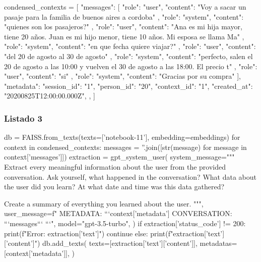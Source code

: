 \begin{APACode}
condensed_contexts = [
    {
        "messages": [
            {
                "role": "user",
                "content": "Voy a sacar un pasaje para la familia de buenos aires a cordoba"
            },
            {
                "role": "system",
                "content": "quienes son los pasajeros?"
            },
            {
                "role": "user",
                "content": "Ana es mi hija mayor, tiene 20 años. Juan es mi hijo menor, tiene 10 años. Mi esposa se llama Ma"
            },
            {
                "role": "system",
                "content": "en que fecha quiere viajar?"
            },
            {
                "role": "user",
                "content": "del 20 de agosto al 30 de agosto"
            },
            {
                "role": "system",
                "content": "perfecto, salen el 20 de agosto a las 10:00 y vuelven el 30 de agosto a las 18:00. El precio t"
            },
            {
                "role": "user",
                "content": "si"
            },
            {
                "role": "system",
                "content": "Gracias por su compra"
            }
        ],
        "metadata": {
            "session_id": "1",
            "person_id": "20",
            "context_id": "1",
            "created_at": "20200825T12:00:00.000Z",
        },
    }
]
\end{APACode}

\subsubsection{Listado 3}
\label{anexo:code-4-1-12-3}

\begin{APACode}
db = FAISS.from_texts(texts=['notebook-11'], embedding=embeddings)
for context in condensed_contexts:
    messages = ''.join([str(message) for message in context['messages']])
    extraction = gpt_system_user(
        system_message="""
        Extract every meaningful information about the user from the provided conversation. 
        Ask yourself, what happened in the conversation?
        What data about the user did you learn?
        At what date and time was this data gathered?
        
        Create a summary of everything you learned about the user.
        """,
        user_message=f" METADATA: ```{context['metadata']} CONVERSATION: ```{messages}``` ```",
        model="gpt-3.5-turbo",
    )
    if extraction['status_code'] != 200:
        print(f"Error: {extraction['text']}")
        continue
    else:
        print(f"{extraction['text']['content']}")
        db.add_texts(
            texts=[extraction['text']['content']],
            metadatas=[context['metadata']],
        )
\end{APACode}

